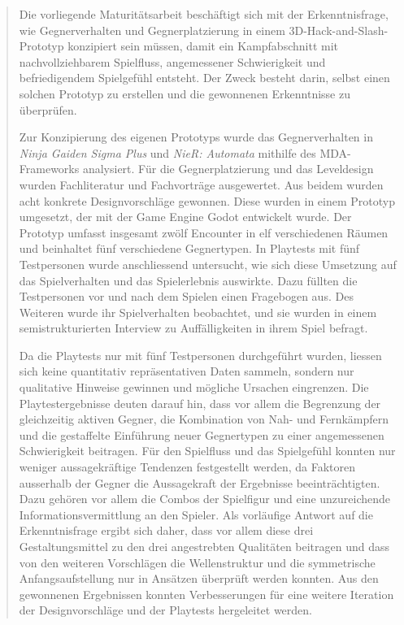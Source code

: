\documentclass[10pt]{article}
\newcommand{\game}[1]{\textit{#1}}   %
\begin{document}
\begin{abstract}
    Die vorliegende Maturitätsarbeit beschäftigt sich mit der Erkenntnisfrage, wie Gegnerverhalten und Gegnerplatzierung in einem 3D-Hack-and-Slash-Prototyp konzipiert sein müssen, damit ein Kampfabschnitt mit nachvollziehbarem Spielfluss, angemessener Schwierigkeit und befriedigendem Spielgefühl entsteht. Der Zweck besteht darin, selbst einen solchen Prototyp zu erstellen und die gewonnenen Erkenntnisse zu überprüfen.

    Zur Konzipierung des eigenen Prototyps wurde das Gegnerverhalten in \game{Ninja Gaiden Sigma Plus} und \game{NieR: Automata} mithilfe des MDA-Frameworks analysiert. Für die Gegnerplatzierung und das Leveldesign wurden Fachliteratur und Fachvorträge ausgewertet. Aus beidem wurden acht konkrete Designvorschläge gewonnen. Diese wurden in einem Prototyp umgesetzt, der mit der Game Engine Godot entwickelt wurde. Der Prototyp umfasst insgesamt zwölf Encounter in elf verschiedenen Räumen und beinhaltet fünf verschiedene Gegnertypen. In Playtests mit fünf Testpersonen wurde anschliessend untersucht, wie sich diese Umsetzung auf das Spielverhalten und das Spielerlebnis auswirkte. Dazu füllten die Testpersonen vor und nach dem Spielen einen Fragebogen aus. Des Weiteren wurde ihr Spielverhalten beobachtet, und sie wurden in einem semistrukturierten Interview zu Auffälligkeiten in ihrem Spiel befragt.

    Da die Playtests nur mit fünf Testpersonen durchgeführt wurden, liessen sich keine quantitativ repräsentativen Daten sammeln, sondern nur qualitative Hinweise gewinnen und mögliche Ursachen eingrenzen. Die Playtestergebnisse deuten darauf hin, dass vor allem die Begrenzung der gleichzeitig aktiven Gegner, die Kombination von Nah- und Fernkämpfern und die gestaffelte Einführung neuer Gegnertypen zu einer angemessenen Schwierigkeit beitragen. Für den Spielfluss und das Spielgefühl konnten nur weniger aussagekräftige Tendenzen festgestellt werden, da Faktoren ausserhalb der Gegner die Aussagekraft der Ergebnisse beeinträchtigten. Dazu gehören vor allem die Combos der Spielfigur und eine unzureichende Informationsvermittlung an den Spieler. Als vorläufige Antwort auf die Erkenntnisfrage ergibt sich daher, dass vor allem diese drei Gestaltungsmittel zu den drei angestrebten Qualitäten beitragen und dass von den weiteren Vorschlägen die Wellenstruktur und die symmetrische Anfangsaufstellung nur in Ansätzen überprüft werden konnten. Aus den gewonnenen Ergebnissen konnten Verbesserungen für eine weitere Iteration der Designvorschläge und der Playtests hergeleitet werden.
\end{abstract}
\end{document}
